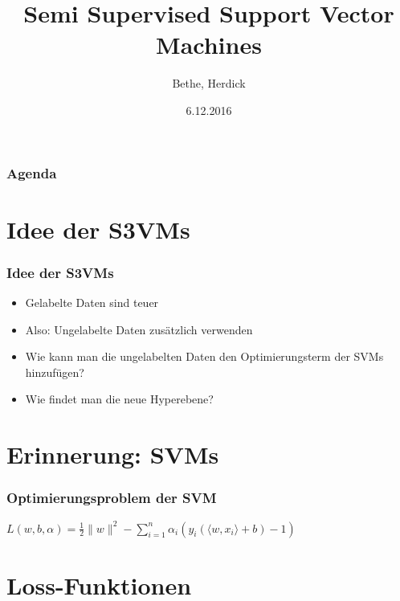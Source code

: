 \documentclass{beamer}
\title{Semi Supervised Support Vector Machines}
\author{Bethe, Herdick}
\date{6.12.2016}
\institute{Classification Algorithms FIN OvGU}
\begin{document}

\begin{frame}[plain]
\titlepage
\end{frame}


\section[Agenda]{}
\begin{frame}
\frametitle{Agenda}
\tableofcontents
\end{frame}

\section{Idee der S3VMs}
\begin{frame}
\frametitle{Idee der S3VMs}
    \begin{itemize}
        \item Gelabelte Daten sind teuer
        \item Also: Ungelabelte Daten zus\"atzlich verwenden
        \item Wie kann man die ungelabelten Daten den Optimierungsterm der SVMs hinzuf\"ugen?
        \item Wie findet man die neue Hyperebene?
    \end{itemize}
\end{frame}




\section{Erinnerung: SVMs}

\begin{frame}
\frametitle{Optimierungsproblem der SVM}
    $L(w,b,\alpha)=\frac{1}{2} \|w\|^2 - \sum_{i=1}^{n} \alpha_i (y_i(\big \langle w,x_i \big\rangle + b)-1)$
\end{frame}




\section{Loss-Funktionen}
\end{document}
